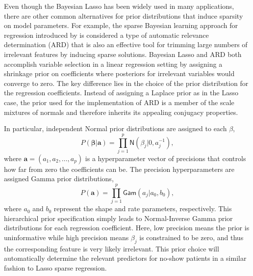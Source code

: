 \documentclass[twoside,11pt]{article}
\newcommand{\ba}{\boldsymbol{a}}
\newcommand{\bbeta}{\boldsymbol{\beta}}
\newcommand{\Gam}{\mathsf{Gam}}
\newcommand{\N}{\mathsf{N}}
\begin{document}
Even though the Bayesian Lasso has been widely used in many applications, there are other common alternatives for prior distributions that induce sparsity on model parameters. For example, the sparse Bayesian learning approach for regression introduced by \cite{Tipping00, Tipping01} is considered a type of automatic relevance determination (ARD) that is also an effective tool for trimming large numbers of irrelevant features by inducing sparse solutions. Bayesian Lasso and ARD both accomplish variable selection in a linear regression setting by assigning a shrinkage prior on coefficients where posteriors for irrelevant variables would converge to zero. The key difference lies in the choice of the prior distribution for the regression coefficients. Instead of assigning a Laplace prior as in the Lasso case, the prior used for the implementation of ARD is a member of the scale mixtures of normals and therefore inherits its appealing conjugacy properties. 

In particular, independent  Normal prior distributions are assigned to each $\beta$,
\begin{equation}
P(\bbeta|\ba)= \prod_{j=1}^{p} \N(\beta_{j}| 0, a^{-1}_{j}),
\end{equation}
where $\ba=(a_1, a_2, \ldots, a_p)$ is a hyperparameter vector of precisions that controls how far from zero the coefficients can be. The precision hyperparameters are assigned Gamma prior distributions, 
\begin{equation}
P(\ba)=\prod_{j=1}^{p} \Gam(a_j|a_0,b_0),
\end{equation}
where $a_0$ and $b_0$ represent the shape and rate parameters, respectively. This hierarchical prior specification simply leads to Normal-Inverse Gamma prior distributions for each regression coefficient. Here, low precision means the prior is uninformative while high precision means $\beta_j$ is constrained to be zero, and thus the corresponding feature is very likely irrelevant. This prior choice will automatically determine the relevant predictors for no-show patients in a similar fashion to Lasso sparse regression. 
\end{document}

